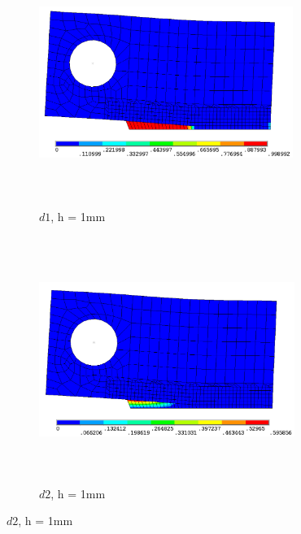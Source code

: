 \documentclass[12pt,a4paper,twoside,openright]{report}
\begin{document}
\begin{figure}[htbp!]
       \captionsetup[subfigure]{justification=centering}
     \begin{subfigure}{0.4\textwidth}
          \includegraphics[width=8.25cm,height=8cm,keepaspectratio]{26.d1-1.png}
         \caption{$d1$, h = 1mm}
         \label{fig:d1-1}
     \end{subfigure}
    \hspace{2cm}
     \captionsetup[subfigure]{justification=centering}
     \begin{subfigure}{0.4\textwidth}
         \includegraphics[width=8.3cm,height=8cm,keepaspectratio]{26.d2-1.png}
         \caption{$d2$, h = 1mm}
         \label{fig:d2-1}
     \end{subfigure}
\end{figure}
\FloatBarrier
\end{document}
